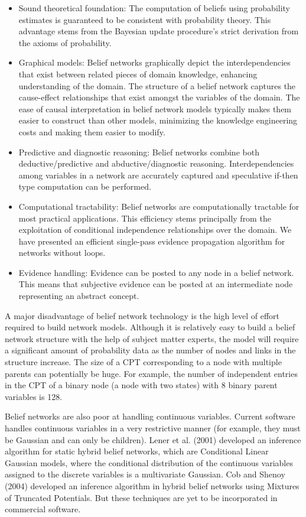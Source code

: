 \documentclass[11pt]{article}
\begin{document}
\begin{itemize}
  \item Sound theoretical foundation: The computation of beliefs using
  probability estimates is guaranteed to be consistent with probability theory.
  This advantage stems from the Bayesian update procedure’s strict derivation
  from the axioms of probability.
  \item Graphical models: Belief networks graphically depict the
  interdependencies that exist between related pieces of domain knowledge,
  enhancing understanding of the domain. The structure of a belief network
  captures the cause-effect relationships that exist amongst the variables of
  the domain. The ease of causal interpretation in belief network models
  typically makes them easier to construct than other models, minimizing the
  knowledge engineering costs and making them easier to modify.
  \item Predictive and diagnostic reasoning: Belief networks combine both
  deductive/predictive and abductive/diagnostic reasoning. Interdependencies
  among variables in a network are accurately captured and speculative if-then
  type computation can be performed.
  \item Computational tractability: Belief networks are computationally
  tractable for most practical applications. This efficiency stems principally
  from the exploitation of conditional independence relationships over the
  domain. We have presented an efficient single-pass evidence propagation
  algorithm for networks without loops.
  \item Evidence handling: Evidence can be posted to any node in a belief
  network. This means that subjective evidence can be posted at an intermediate
  node representing an abstract concept.
\end{itemize}

A major disadvantage of belief network technology is the high level of effort
required to build network models. Although it is relatively easy to build a
belief network structure with the help of subject matter experts, the model will
require a significant amount of probability data as the number of nodes and
links in the structure increase. The size of a CPT corresponding to a node with
multiple parents can potentially be huge. For example, the number of independent
entries in the CPT of a binary node (a node with two states) with 8 binary
parent variables is 128.

Belief networks are also poor at handling continuous variables. Current
software handles continuous variables in a very restrictive manner (for example,
they must be Gaussian and can only be children). Lener et al. (2001) developed
an inference algorithm for static hybrid belief networks, which are Conditional
Linear Gaussian models, where the conditional distribution of the continuous
variables assigned to the discrete variables is a multivariate Gaussian. Cob and
Shenoy (2004) developed an inference algorithm in hybrid belief networks using
Mixtures of Truncated Potentials. But these techniques are yet to be incorporated
in commercial software.
\end{document}
